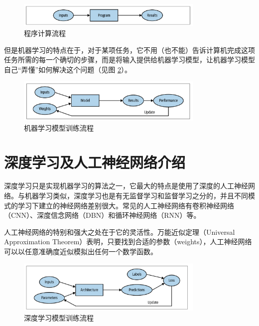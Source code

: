 \documentclass[AutoFakeBold]{LZUThesis}
\begin{document}
\begin{figure}[H]
    \centering
    \includegraphics[width=0.8\textwidth]{figures/input_output.png}
    \caption{程序计算流程}
    \label{fig_input_output}
\end{figure}

但是机器学习的特点在于，对于某项任务，它不用（也不能）告诉计算机完成这项任务所需的每一个确切的步骤，而是将输入提供给机器学习模型，让机器学习模型自己“弄懂”如何解决这个问题（见图 \ref{fig_machine-learning}）。

\begin{figure}[H]
    \centering
    \includegraphics[width=0.8\textwidth]{figures/machine-learning.png}
    \caption{机器学习模型训练流程}
    \label{fig_machine-learning}
\end{figure}






\section{深度学习及人工神经网络介绍}
深度学习只是实现机器学习的算法之一，它最大的特点是使用了深度的人工神经网络。与机器学习类似，深度学习也是有无监督学习和监督学习之分的，并且不同模式的学习下建立的神经网络差别很大。常见的人工神经网络有卷积神经网络（CNN）、深度信念网络（DBN）和循环神经网络（RNN）等。

人工神经网络的特别和强大之处在于它的灵活性。万能近似定理（Universal Approximation Theorem）表明，只要找到合适的参数（weights），人工神经网络可以以任意准确度近似模拟出任何一个数学函数。

\begin{figure}[H]
    \centering
    \includegraphics[width=0.8\textwidth]{figures/deep-learning.png}
    \caption{深度学习模型训练流程}
    \label{fig_deep-learning}
\end{figure}
\end{document}
